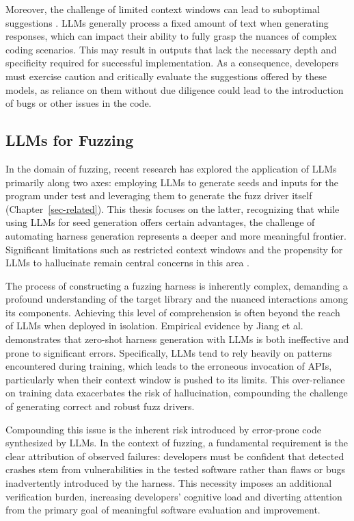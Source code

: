 \documentclass[
  a4paper,
]{scrreprt}
\theoremstyle{definition}
\theoremstyle{remark}
\begin{document}
Moreover, the challenge of limited context windows can lead to
suboptimal suggestions \autocite{kaddour2023}. LLMs generally process a
fixed amount of text when generating responses, which can impact their
ability to fully grasp the nuances of complex coding scenarios. This may
result in outputs that lack the necessary depth and specificity required
for successful implementation. As a consequence, developers must
exercise caution and critically evaluate the suggestions offered by
these models, as reliance on them without due diligence could lead to
the introduction of bugs or other issues in the code.

\subsection{LLMs for Fuzzing}\label{llms-for-fuzzing}

In the domain of fuzzing, recent research has explored the application
of LLMs primarily along two axes: employing LLMs to generate seeds and
inputs for the program under test
\autocite{titanfuzz,black2024,shi2024,fuzzgpt} and leveraging them to
generate the fuzz driver itself (Chapter~\ref{sec-related}). This thesis
focuses on the latter, recognizing that while using LLMs for seed
generation offers certain advantages, the challenge of automating
harness generation represents a deeper and more meaningful frontier.
Significant limitations such as restricted context windows and the
propensity for LLMs to hallucinate remain central concerns in this area
\autocite{huang2025,kaddour2023}.

The process of constructing a fuzzing harness is inherently complex,
demanding a profound understanding of the target library and the nuanced
interactions among its components. Achieving this level of comprehension
is often beyond the reach of LLMs when deployed in isolation. Empirical
evidence by Jiang et al. \autocite{jiang2024} demonstrates that
zero-shot harness generation with LLMs is both ineffective and prone to
significant errors. Specifically, LLMs tend to rely heavily on patterns
encountered during training, which leads to the erroneous invocation of
APIs, particularly when their context window is pushed to its limits.
This over-reliance on training data exacerbates the risk of
hallucination, compounding the challenge of generating correct and
robust fuzz drivers.

Compounding this issue is the inherent risk introduced by error-prone
code synthesized by LLMs. In the context of fuzzing, a fundamental
requirement is the clear attribution of observed failures: developers
must be confident that detected crashes stem from vulnerabilities in the
tested software rather than flaws or bugs inadvertently introduced by
the harness. This necessity imposes an additional verification burden,
increasing developers' cognitive load and diverting attention from the
primary goal of meaningful software evaluation and improvement.
\end{document}
